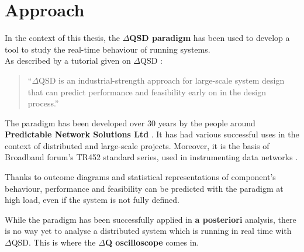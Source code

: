 \section{Approach}
    In the context of this thesis, the \textbf{$\Delta$QSD paradigm} has been used to develop a tool to study the real-time behaviour of running systems. \\
    As described by a tutorial given on $\Delta$QSD \cite{dq-tut}:
    \begin{quote}
        ``$\Delta$QSD is an industrial-strength approach for large-scale system design that can predict performance and feasibility early on in the design process.'' 
    \end{quote}
    The paradigm has been developed over 30 years by the people around \textbf{Predictable Network Solutions Ltd} \cite{pnsol}\cite{myo}. It has had various successful uses in the context of distributed and large-scale projects. Moreover, it is the basis of Broadband forum's TR452 standard series, used in instrumenting data networks \cite{dq-br}.

    Thanks to outcome diagrams and statistical representations of component's behaviour, performance and feasibility can be predicted with the paradigm at high load, even if the system is not fully defined.  \cite{dq-tut} \cite{myo}
 
    While the paradigm has been successfully applied in \textbf{a posteriori} analysis, there is no way yet to analyse a distributed system which is running in real time with $\Delta$QSD. This is where the \textbf{$\Delta$Q oscilloscope} comes in.
